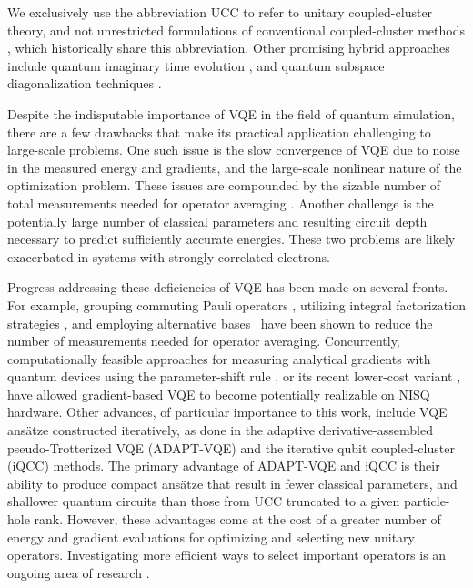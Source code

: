 \documentclass[aps,prx, reprint]{revtex4-2}
\begin{document}
We exclusively use the abbreviation UCC to refer to unitary coupled-cluster theory, and not unrestricted formulations of conventional coupled-cluster methods \cite{knowles1993coupled}, which historically share this abbreviation.
Other promising hybrid approaches include quantum imaginary time evolution \cite{motta2019determining,PRXQuantum.2.010317}, and quantum subspace diagonalization techniques \cite{mcclean2017hybrid, motta2019determining, Parrish:2019tc, Stair_2020, huggins2020non}.


Despite the indisputable importance of VQE in the field of quantum simulation, there are a few drawbacks that make its practical application challenging to large-scale problems.
One such issue is the slow convergence of VQE due to noise in the measured energy and gradients, and the large-scale nonlinear nature of the optimization problem.
These issues are compounded by the sizable number of total measurements needed for operator averaging \cite{wecker2015progress}.
Another challenge is the potentially large number of classical parameters and resulting circuit depth necessary to predict sufficiently accurate energies.
These two problems are likely exacerbated in systems with strongly correlated electrons.

Progress addressing these deficiencies of VQE has been made on several fronts.
For example, grouping commuting Pauli operators \cite{McClean:2016bs, kandala2017hardware, gokhale2019minimizing, yen2020measuring, verteletskyi2020measurement}, utilizing integral factorization strategies \cite{huggins2021efficient}, and employing alternative bases~\cite{babbush2018low, mcclean2020discontinuous} have been shown to reduce the number of measurements needed for operator averaging.
Concurrently, computationally feasible approaches for measuring analytical gradients with quantum devices using the parameter-shift rule \cite{schuld2019evaluating}, or its recent lower-cost variant \cite{kottmann2020feasible}, have allowed gradient-based VQE to become potentially realizable on NISQ hardware.
Other advances, of particular importance to this work, include VQE ans\"{a}tze constructed iteratively, as done in the adaptive derivative-assembled pseudo-Trotterized VQE \cite{grimsley2019adaptive} (ADAPT-VQE) and the iterative qubit coupled-cluster \cite{ryabinkin2020iterative} (iQCC) methods.
The primary advantage of ADAPT-VQE and iQCC is their ability to produce compact ans\"{a}tze that result in fewer classical parameters, and shallower quantum circuits than those from UCC truncated to a given particle-hole rank.
However, these advantages come at the cost of a greater number of energy and gradient evaluations for optimizing and selecting new unitary operators.
Investigating more efficient ways to select important operators is an ongoing area of research \cite{zhang2020mutual, liu2020efficient}.
\end{document}

